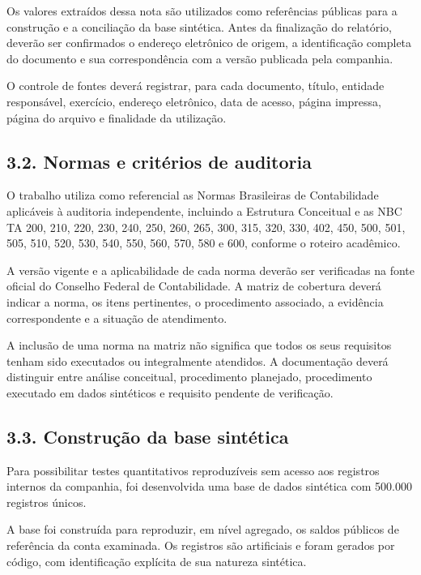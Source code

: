 \documentclass[
]{article}
\begin{document}
Os valores extraídos dessa nota são utilizados como referências públicas
para a construção e a conciliação da base sintética. Antes da
finalização do relatório, deverão ser confirmados o endereço eletrônico
de origem, a identificação completa do documento e sua correspondência
com a versão publicada pela companhia.

O controle de fontes deverá registrar, para cada documento, título,
entidade responsável, exercício, endereço eletrônico, data de acesso,
página impressa, página do arquivo e finalidade da utilização.

\subsection{3.2. Normas e critérios de
auditoria}\label{normas-e-crituxe9rios-de-auditoria}

O trabalho utiliza como referencial as Normas Brasileiras de
Contabilidade aplicáveis à auditoria independente, incluindo a Estrutura
Conceitual e as NBC TA 200, 210, 220, 230, 240, 250, 260, 265, 300, 315,
320, 330, 402, 450, 500, 501, 505, 510, 520, 530, 540, 550, 560, 570,
580 e 600, conforme o roteiro acadêmico.

A versão vigente e a aplicabilidade de cada norma deverão ser
verificadas na fonte oficial do Conselho Federal de Contabilidade. A
matriz de cobertura deverá indicar a norma, os itens pertinentes, o
procedimento associado, a evidência correspondente e a situação de
atendimento.

A inclusão de uma norma na matriz não significa que todos os seus
requisitos tenham sido executados ou integralmente atendidos. A
documentação deverá distinguir entre análise conceitual, procedimento
planejado, procedimento executado em dados sintéticos e requisito
pendente de verificação.

\subsection{3.3. Construção da base
sintética}\label{construuxe7uxe3o-da-base-sintuxe9tica}

Para possibilitar testes quantitativos reproduzíveis sem acesso aos
registros internos da companhia, foi desenvolvida uma base de dados
sintética com 500.000 registros únicos.

A base foi construída para reproduzir, em nível agregado, os saldos
públicos de referência da conta examinada. Os registros são artificiais
e foram gerados por código, com identificação explícita de sua natureza
sintética.
\end{document}
